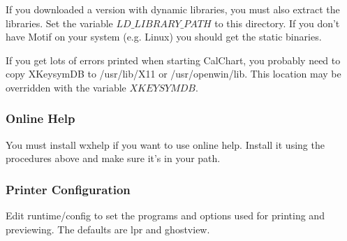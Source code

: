 If you downloaded a version with dynamic libraries, you must also
extract the libraries.  Set the variable $LD\_LIBRARY\_PATH$ to this
directory.  If you don't have Motif on your system (e.g. Linux) you
should get the static binaries.

If you get lots of errors printed when starting CalChart, you probably
need to copy XKeysymDB to /usr/lib/X11 or /usr/openwin/lib.  This
location may be overridden with the variable $XKEYSYMDB$.

\subsubsection{Online Help}\label{unixhelp}

You must install wxhelp if you want to use online help.  Install it using
the procedures above and make sure it's in your path.

\subsubsection{Printer Configuration}\label{unixprinter}

Edit runtime/config to set the programs and options used for printing
and previewing.  The defaults are lpr and ghostview.
